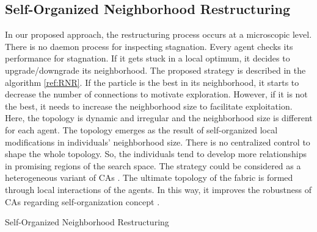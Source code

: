 \documentclass{llncs}
\begin{document}
\subsection{Self-Organized Neighborhood Restructuring}
In our proposed approach, the restructuring process occurs at a microscopic level. There is no daemon process for inspecting stagnation. Every agent checks its performance for stagnation. If it gets stuck in a local optimum, it decides to upgrade/downgrade its neighborhood. The proposed strategy is described in the algorithm \ref{ref:RNR}. If the particle is the best in its neighborhood, it starts to decrease the number of connections to motivate exploration. However, if it is not the best, it needs to increase the neighborhood size to facilitate exploitation. Here, the topology is dynamic and irregular and the neighborhood size is different for each agent. The topology emerges as the result of self-organized local modifications in individuals' neighborhood size. There is no centralized control to shape the whole topology. So, the individuals tend to develop more relationships in promising regions of the search space. The strategy could be considered as a heterogeneous variant of CAs \cite{de2009heterogeneous}. The ultimate topology of the fabric is formed through local interactions of the agents. In this way, it improves the robustness of CAs regarding self-organization concept \cite{kennedy2001swarm}.
\begin{algorithm}{	}
			\caption{Self-Organized Neighborhood Restructuring}			
		\label{ref:RNR}
\end{algorithm}
\end{document}
